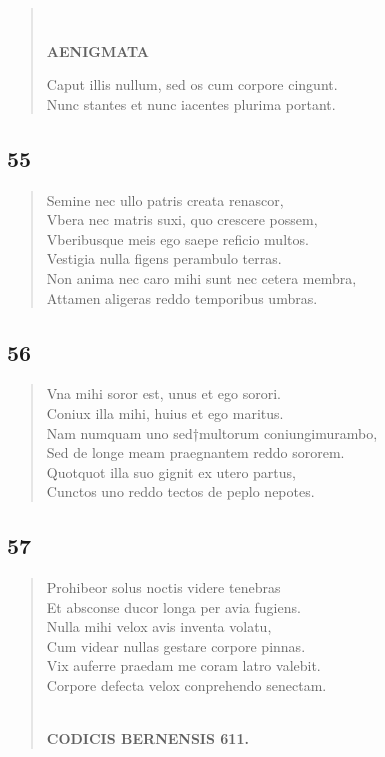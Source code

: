 \documentclass[11pt, a4paper]{report}
\begin{document}
\begin{verse}
        ﻿\pagebreak 
    \begin{center} \textbf{AENIGMATA} \end{center} \marginpar{[368]} Caput illis nullum, sed os cum corpore cingunt. \\ Nunc stantes et nunc iacentes plurima portant. \\ 
      \end{verse}
  
            \subsection*{55}
      \begin{verse}
      Semine nec ullo patris creata renascor, \\ Vbera nec matris suxi, quo crescere possem, \\ Vberibusque meis ego saepe reficio multos. \\ Vestigia nulla figens perambulo terras. \\ Non anima nec caro mihi sunt nec cetera membra, \\ Attamen aligeras reddo temporibus umbras. \\ 
      \end{verse}
  
            \subsection*{56}
      \begin{verse}
      Vna mihi soror est, unus et ego sorori. \\ Coniux illa mihi, huius et ego maritus. \\ Nam numquam uno sed†multorum coniungimurambo, \\ Sed de longe meam praegnantem reddo sororem. \\ Quotquot illa suo gignit ex utero partus, \\ Cunctos uno reddo tectos de peplo nepotes. \\ 
      \end{verse}
  
            \subsection*{57}
      \begin{verse}
      Prohibeor solus noctis videre tenebras \\ Et absconse ducor longa per avia fugiens. \\ Nulla mihi velox avis inventa volatu, \\ Cum videar nullas gestare corpore pinnas. \\ Vix auferre praedam me coram latro valebit. \\ Corpore defecta velox conprehendo senectam. \\ 
        ﻿\pagebreak 
    \begin{center} \textbf{CODICIS BERNENSIS 611.} \end{center} \marginpar{[369]} 
      \end{verse}
  
\end{document}
